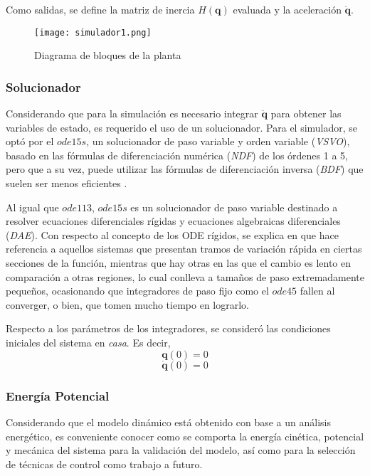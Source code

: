     Como salidas, se define la matriz de inercia $H(\boldsymbol{q})$ evaluada y la aceleración $\boldsymbol{\ddot{q}}$.
    \begin{figure}[H]
        \texttt{[image: simulador1.png]}
        \centering
        \caption{Diagrama de bloques de la planta}
        \label{fig:planta}
    \end{figure}
    
    \subsubsection{Solucionador}
    Considerando que para la simulación es necesario integrar $\boldsymbol{\ddot{q}}$ para obtener las variables de estado,
    es requerido el uso de un solucionador. Para el simulador, se optó por el $ode15s$, un solucionador de paso variable y orden variable (\emph{VSVO}), basado en las fórmulas de diferenciación numérica
    (\emph{NDF}) de los órdenes 1 a 5, pero que a su vez, puede utilizar las fórmulas de diferenciación inversa (\emph{BDF}) que suelen ser menos eficientes \cite{ode15s}. 
    
    Al igual que $ode113$, $ode15s$ es un solucionador de paso variable destinado a resolver ecuaciones diferenciales rígidas y ecuaciones algebraicas diferenciales (\emph{DAE}). 
    Con respecto al concepto de los ODE rígidos, se explica en \cite{ODEs} que hace referencia a aquellos sistemas que presentan tramos de variación rápida en ciertas secciones de
    la función, mientras que hay otras en las que el cambio es lento en comparación a otras regiones, lo cual conlleva a tamaños de paso extremadamente pequeños, ocasionando que
    integradores de paso fijo como el $ode45$ fallen al converger, o bien, que tomen mucho tiempo en lograrlo.

    Respecto a los parámetros de los integradores, se consideró las condiciones iniciales del sistema en \emph{casa}. Es decir, 
    \begin{equation*}
        \label{eqn:init_q}
        \boldsymbol{q}(0) = 0
    \end{equation*}
    \begin{equation*}
        \label{eqn:init_dq}
        \boldsymbol{\dot{q}}(0) = 0
    \end{equation*}

    \subsubsection{Energía Potencial}
    \noindent Considerando que el modelo dinámico está obtenido con base a un análisis energético, es conveniente conocer como se comporta la energía cinética, potencial y mecánica del 
    sistema para la validación del modelo, así como para la selección de técnicas de control como trabajo a futuro.
    
